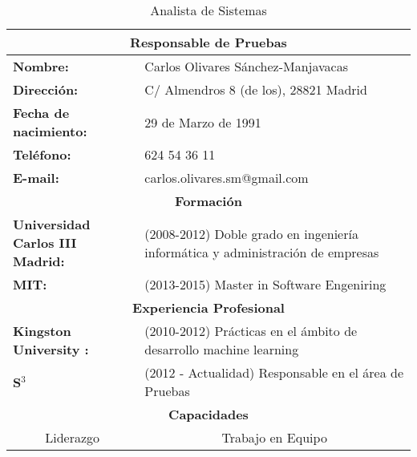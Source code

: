 \begin{table}[H]
\begin{center}
\begin{tabular}{p{} p{9cm}}
\multicolumn{2}{c}{\Large{\textbf{Responsable de Pruebas}}} \\
\hline
\textbf{Nombre:} & Carlos Olivares Sánchez-Manjavacas\\
\textbf{Dirección:} & C/ Almendros 8 (de los), 28821 Madrid\\
\textbf{Fecha de nacimiento:} & 29 de Marzo de 1991 \\
\textbf{Teléfono:} & 624 54 36 11\\
\textbf{E-mail:} & carlos.olivares.sm@gmail.com\\
\hline \hline
\multicolumn{2}{c}{\textbf{Formación} } \\
\hline
\textbf{Universidad Carlos III Madrid:} &  (2008-2012) Doble grado en ingeniería informática y administración de empresas  \\
\textbf{MIT:} &  (2013-2015) Master in Software Engeniring   \\
\multicolumn{2}{c}{\textbf{Experiencia Profesional} } \\
\hline
\textbf{Kingston University :} &  (2010-2012) Prácticas en el ámbito de desarrollo machine learning  \\
\textbf{S$^3$} & (2012 - Actualidad) Responsable en el área de Pruebas \\
\hline \hline
\multicolumn{2}{c}{\textbf{Capacidades} } \\
\hline
\multicolumn{1}{c}{Liderazgo} & \multicolumn{1}{c}{Trabajo en Equipo} \\
\hline
\end{tabular}
\caption{Analista de Sistemas}
\label{tab:AnalistadeSistemas}
\end{center}
\end{table}



